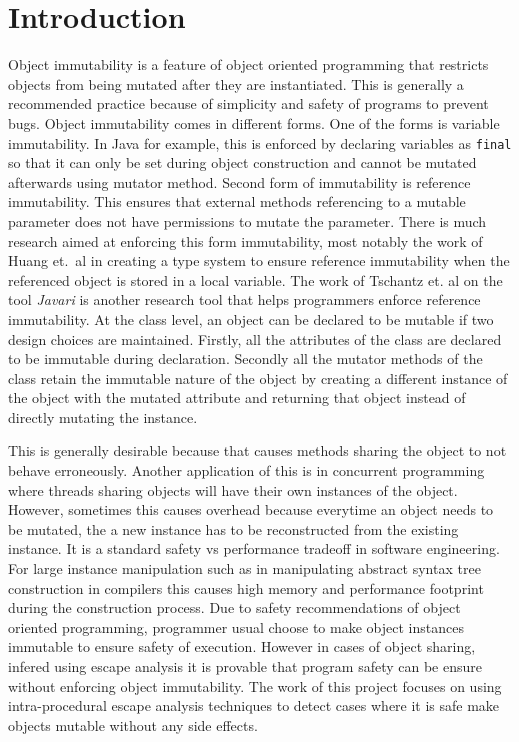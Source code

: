 \section{Introduction}
Object immutability is a feature of object oriented programming that restricts objects from being mutated after they are instantiated. This is generally a recommended practice because of simplicity and safety of programs to prevent bugs. Object immutability comes in different forms. One of the forms is variable immutability. In Java for example, this is enforced by declaring variables as \texttt{final} so that it can only be set during object construction and cannot be mutated afterwards using mutator method. Second form of immutability is reference immutability. This ensures that external methods referencing to a mutable parameter does not have permissions to mutate the parameter. There is much research aimed at enforcing this form immutability, most notably the work of Huang et.\ al \citep{ref:ReIm} in creating a type system to ensure reference immutability when the referenced object is stored in a local variable. The work of Tschantz et. al on the tool \textit{Javari} \cite{ref:javari} is another research tool that helps programmers enforce reference immutability. At the class level, an object can be declared to be mutable if two design choices are maintained. Firstly, all the attributes of the class are declared to be immutable during declaration. Secondly all the mutator methods of the class retain the immutable nature of the object by creating a different instance of the object with the mutated attribute and returning that object instead of directly mutating the instance. 

This is generally desirable because that causes methods sharing the object to not behave erroneously. Another application of this is in concurrent programming where threads sharing objects will have their own instances of the object. However, sometimes this causes overhead because everytime an object needs to be mutated, the a new instance has to be reconstructed from the existing instance. It is a standard safety vs performance tradeoff in software engineering. For large instance manipulation such as in manipulating abstract syntax tree construction in compilers this causes high memory and performance footprint during the construction process. Due to safety recommendations of object oriented programming, programmer usual choose to make object instances immutable to ensure safety of execution. However in cases of object sharing, infered using escape analysis \citep{ref:compositionalEscape}\cite{ref:escapejava}\cite{ref:incrementalescape} it is provable that program safety can be ensure without enforcing object immutability. The work of this project focuses on using intra-procedural escape analysis techniques \cite{ref:Kotzmann} to detect cases where it is safe make objects mutable without any side effects.

